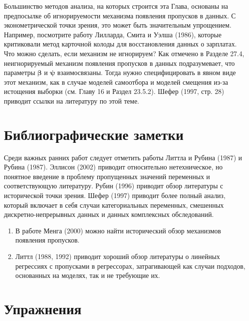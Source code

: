 Большинство методов анализа, на которых строится эта Глава, основаны на предпосылке об игнорируемости механизма появления пропусков в данных. С эконометрической точки зрения, это может быть значительным упрощением. Например, посмотрите работу Лилларда, Смита и Уэлша (1986), которые критиковали метод карточной колоды для восстановления данных о зарплатах. Что можно сделать, если механизм не игнорируем? Как отмечено в Разделе 27.4, неигнорируемый механизм появления пропусков в данных подразумевает, что параметры $\mathbf{\beta}$ и $\mathbf{\psi}$ взаимосвязаны. Тогда нужно специфицировать в явном виде этот механизм, как в случае моделей самоотбора  и моделей смещения из-за истощения выборки (см. Главу 16 и Раздел 23.5.2). Шефер (1997, стр. 28) приводит ссылки на литературу по этой теме.

\section{Библиографические заметки}
Среди важных ранних работ следует отметить работы Литтла и Рубина (1987) и Рубина (1987). Эллисон (2002) приводит относительно нетехническое, но понятное введение в проблему пропущенных значений переменных и соответствующую литературу. Рубин (1996) приводит обзор литературы с исторической точки зрения. Шефер (1997) приводит более полный анализ, который включает в себя случаи категориальных переменных, смешенных дискретно-непрерывных данных и данных комплексных обследований.
\begin{enumerate}
\item В работе Менга (2000) можно найти исторический обзор механизмов появления пропусков.
\item Литтл (1988, 1992) приводит хороший обзор литературы о линейных регрессиях с пропусками в регрессорах, затрагивающей как случаи подходов, основанных на моделях, так и не требующие их.
\end{enumerate}

\section*{Упражнения} 

